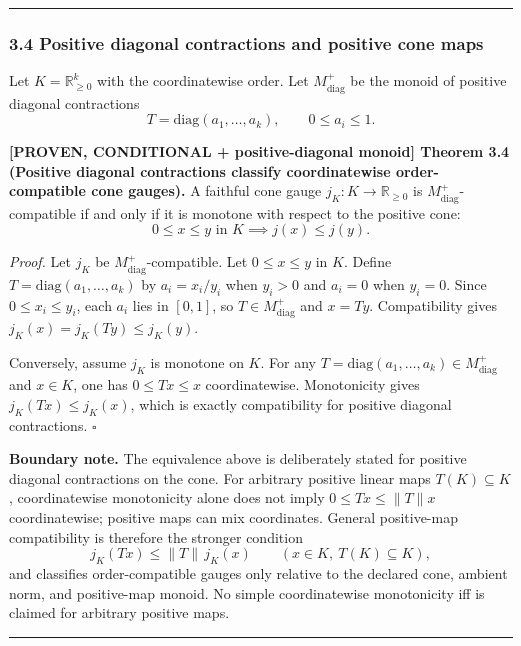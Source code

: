 \documentclass[
  11pt,
]{article}
\begin{document}
\begin{center}\rule{0.5\linewidth}{0.5pt}\end{center}

\subsubsection{3.4 Positive diagonal contractions and positive cone maps}\label{positive-diagonal-contractions-and-positive-cone-maps}

Let \(K = \mathbb{R}^k_{\geq 0}\) with the coordinatewise order. Let \(M_{\mathrm{diag}}^+\) be the monoid of positive diagonal contractions
\[
T=\mathrm{diag}(a_1,\dots,a_k),
\qquad
0\le a_i\le1.
\]

\textbf{{[}PROVEN, CONDITIONAL + positive-diagonal monoid{]} Theorem 3.4 (Positive diagonal contractions classify coordinatewise order-compatible cone gauges).} A faithful cone gauge \(j_K:K\to\mathbb R_{\ge0}\) is \(M_{\mathrm{diag}}^+\)-compatible if and only if it is monotone with respect to the positive cone:
\[0 \leq x \leq y \text{ in } K \implies j(x) \leq j(y).\]

\emph{Proof.} Let \(j_K\) be \(M_{\mathrm{diag}}^+\)-compatible. Let \(0 \leq x \leq y\) in \(K\). Define \(T=\mathrm{diag}(a_1,\dots,a_k)\) by \(a_i=x_i/y_i\) when \(y_i>0\) and \(a_i=0\) when \(y_i=0\). Since \(0\le x_i\le y_i\), each \(a_i\) lies in \([0,1]\), so \(T\in M_{\mathrm{diag}}^+\) and \(x=Ty\). Compatibility gives \(j_K(x)=j_K(Ty)\le j_K(y)\).

Conversely, assume \(j_K\) is monotone on \(K\). For any \(T=\mathrm{diag}(a_1,\dots,a_k)\in M_{\mathrm{diag}}^+\) and \(x\in K\), one has \(0\le Tx\le x\) coordinatewise. Monotonicity gives \(j_K(Tx)\le j_K(x)\), which is exactly compatibility for positive diagonal contractions. \(\square\)

\textbf{Boundary note.} The equivalence above is deliberately stated for positive diagonal contractions on the cone. For arbitrary positive linear maps \(T(K)\subseteq K\), coordinatewise monotonicity alone does not imply \(0\le Tx\le \|T\|x\) coordinatewise; positive maps can mix coordinates. General positive-map compatibility is therefore the stronger condition
\[
j_K(Tx)\le \|T\|\,j_K(x)
\qquad
(x\in K,\ T(K)\subseteq K),
\]
and classifies order-compatible gauges only relative to the declared cone, ambient norm, and positive-map monoid. No simple coordinatewise monotonicity iff is claimed for arbitrary positive maps.

\begin{center}\rule{0.5\linewidth}{0.5pt}\end{center}
\end{document}
